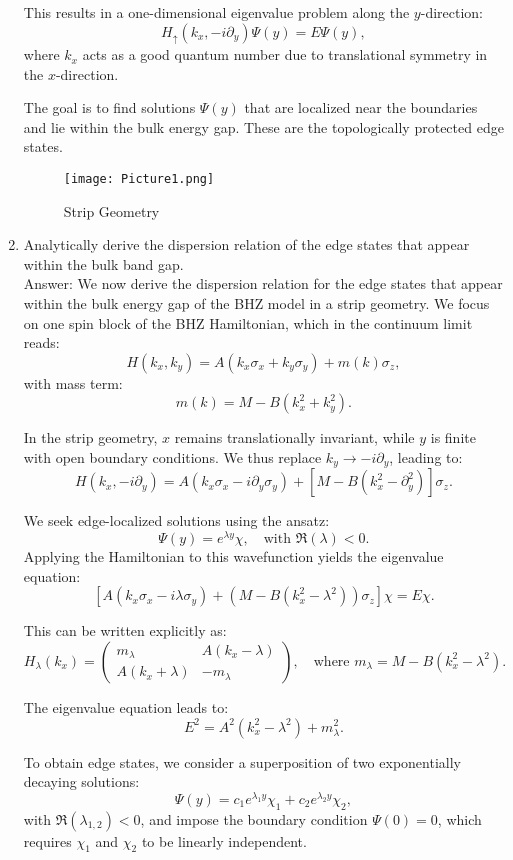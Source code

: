 \documentclass[a4paper,12pt]{article}
\begin{document}
\begin{enumerate}
This results in a one-dimensional eigenvalue problem along the \( y \)-direction:
\[
H_\uparrow(k_x, -i\partial_y) \Psi(y) = E \Psi(y),
\]
where \( k_x \) acts as a good quantum number due to translational symmetry in the \( x \)-direction.

The goal is to find solutions \( \Psi(y) \) that are localized near the boundaries and lie within the bulk energy gap. These are the topologically protected edge states.
\begin{figure}[h]
\centering
\texttt{[image: Picture1.png]}
\caption{Strip Geometry}
\label{fig.Picture1}
\end{figure}

    \item Analytically derive the dispersion relation of the edge states that appear within the bulk band gap.\\
Answer: We now derive the dispersion relation for the edge states that appear within the bulk energy gap of the BHZ model in a strip geometry. We focus on one spin block of the BHZ Hamiltonian, which in the continuum limit reads:
\[
H(k_x, k_y) = A(k_x \sigma_x + k_y \sigma_y) + m(k) \sigma_z,
\]
with mass term:
\[
m(k) = M - B(k_x^2 + k_y^2).
\]

In the strip geometry, \( x \) remains translationally invariant, while \( y \) is finite with open boundary conditions. We thus replace \( k_y \rightarrow -i\partial_y \), leading to:
\[
H(k_x, -i\partial_y) = A(k_x \sigma_x - i \partial_y \sigma_y) + [M - B(k_x^2 - \partial_y^2)] \sigma_z.
\]

We seek edge-localized solutions using the ansatz:
\[
\Psi(y) = e^{\lambda y} \chi, \quad \text{with } \Re(\lambda) < 0.
\]
Applying the Hamiltonian to this wavefunction yields the eigenvalue equation:
\[
\left[ A(k_x \sigma_x - i \lambda \sigma_y) + (M - B(k_x^2 - \lambda^2)) \sigma_z \right] \chi = E \chi.
\]

This can be written explicitly as:
\[
H_\lambda(k_x) =
\begin{pmatrix}
m_\lambda & A(k_x - \lambda) \\
A(k_x + \lambda) & -m_\lambda
\end{pmatrix}, \quad \text{where } m_\lambda = M - B(k_x^2 - \lambda^2).
\]

The eigenvalue equation leads to:
\[
E^2 = A^2(k_x^2 - \lambda^2) + m_\lambda^2.
\]

To obtain edge states, we consider a superposition of two exponentially decaying solutions:
\[
\Psi(y) = c_1 e^{\lambda_1 y} \chi_1 + c_2 e^{\lambda_2 y} \chi_2,
\]
with \( \Re(\lambda_{1,2}) < 0 \), and impose the boundary condition \( \Psi(0) = 0 \), which requires \( \chi_1 \) and \( \chi_2 \) to be linearly independent.


\end{enumerate}
\end{document}
